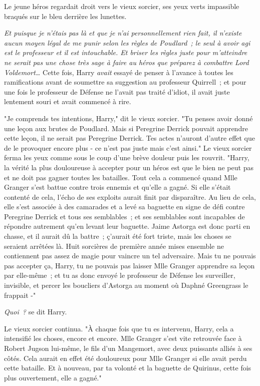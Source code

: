 Le jeune héros regardait droit vers le vieux sorcier, ses yeux verts impassible braqués sur le bleu derrière les lunettes.

\emph{Et puisque je n'étais pas là et que je n'ai personnellement rien fait, il n'existe aucun moyen légal de me punir selon les règles de Poudlard~; le seul à avoir agi est le professeur et il est intouchable. Et briser les règles juste pour m'atteindre ne serait pas une chose très sage à faire au héros que préparez à combattre Lord Voldemort…} Cette fois, Harry \emph{avait} essayé de penser à l'avance à toutes les ramifications avant de soumettre sa suggestion au professeur Quirrell~; et pour une fois le professeur de Défense ne l'avait pas traité d'idiot, il avait juste lentement souri et avait commencé à rire.

"Je comprends tes intentions, Harry," dit le vieux sorcier. "Tu penses avoir donné une leçon aux brutes de Poudlard. Mais si Peregrine Derrick pouvait apprendre cette leçon, il ne serait pas Peregrine Derrick. Tes actes n'auront d'autre effet que de le provoquer encore plus - ce n'est pas juste mais c'est ainsi." Le vieux sorcier ferma les yeux comme sous le coup d'une brève douleur puis les rouvrit. "Harry, la vérité la plus douloureuse à accepter pour un héros est que le bien ne peut pas et ne doit pas gagner toutes les batailles. Tout cela a commencé quand Mlle Granger s'est battue contre trois ennemis et qu'elle a gagné. Si elle s'était contenté de cela, l'écho de ses exploits aurait finit par disparaître. Au lieu de cela, elle s'est associée à des camarades et a levé sa baguette en signe de défi contre Peregrine Derrick et tous ses semblables~; et ses semblables sont incapables de répondre autrement qu'en levant leur baguette. Jaime Astorga est donc parti en chasse, et il aurait dû la battre~; ç'aurait été fort triste, mais les choses se seraient arrêtées là. Huit sorcières de première année mises ensemble ne contiennent pas assez de magie pour vaincre un tel adversaire. Mais tu ne pouvais pas accepter ça, Harry, tu ne pouvais pas laisser Mlle Granger apprendre sa leçon par elle-même~; et tu as donc envoyé le professeur de Défense les surveiller, invisible, et percer les boucliers d'Astorga au moment où Daphné Greengrass le frappait -"

\emph{Quoi~?} se dit Harry.

Le vieux sorcier continua. "À chaque fois que tu es intervenu, Harry, cela a intensifié les choses, encore et encore. Mlle Granger s'est vite retrouvée face à Robert Jugson lui-même, le fils d'un Mangemort, avec deux puissants alliés à ses côtés. Cela aurait en effet été douloureux pour Mlle Granger si elle avait perdu cette bataille. Et à nouveau, par ta volonté et la baguette de Quirinus, cette fois plus ouvertement, elle a gagné."

